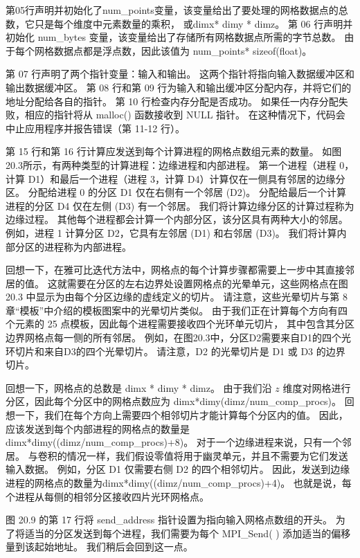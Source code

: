 第05行声明并初始化了num\_points变量，该变量给出了要处理的网格数据点的总数，它只是每个维度中元素数量的乘积，
或dimx* dimy * dimz。 第 06 行声明并初始化 num\_bytes 变量，该变量给出了存储所有网格数据点所需的字节总数。 
由于每个网格数据点都是浮点数，因此该值为 num\_points* sizeof(float)。

第 07 行声明了两个指针变量：输入和输出。 这两个指针将指向输入数据缓冲区和输出数据缓冲区。 
第 08 行和第 09 行为输入和输出缓冲区分配内存，并将它们的地址分配给各自的指针。 第 10 行检查内存分配是否成功。 
如果任一内存分配失败，相应的指针将从 malloc() 函数接收到 NULL 指针。 
在这种情况下，代码会中止应用程序并报告错误（第 11-12 行）。

第 15 行和第 16 行计算应发送到每个计算进程的网格点数组元素的数量。 
如图20.3所示，有两种类型的计算进程：边缘进程和内部进程。 
第一个进程（进程 0，计算 D1）和最后一个进程（进程 3，计算 D4）计算仅在一侧具有邻居的边缘分区。 
分配给进程 0 的分区 D1 仅在右侧有一个邻居 (D2)。 分配给最后一个计算进程的分区 D4 仅在左侧 (D3) 有一个邻居。 
我们将计算边缘分区的计算过程称为边缘过程。 其他每个进程都会计算一个内部分区，该分区具有两种大小的邻居。 
例如，进程 1 计算分区 D2，它具有左邻居 (D1) 和右邻居 (D3)。 我们将计算内部分区的进程称为内部进程。

回想一下，在雅可比迭代方法中，网格点的每个计算步骤都需要上一步中其直接邻居的值。 
这就需要在分区的左右边界处设置网格点的光晕单元，这些网格点在图 20.3 中显示为由每个分区边缘的虚线定义的切片。 
请注意，这些光晕切片与第 8 章“模板”中介绍的模板图案中的光晕切片类似。 
由于我们正在计算每个方向有四个元素的 25 点模板，因此每个进程需要接收四个光环单元切片，
其中包含其分区边界网格点每一侧的所有邻居。 例如，在图20.3中，分区D2需要来自D1的四个光环切片和来自D3的四个光晕切片。 
请注意，D2 的光晕切片是 D1 或 D3 的边界切片。

回想一下，网格点的总数是 dimx * dimy * dimz。 
由于我们沿 $z$ 维度对网格进行分区，因此每个分区中的网格点数应为 dimx*dimy(dimz/num\_comp\_procs)。 
回想一下，我们在每个方向上需要四个相邻切片才能计算每个分区内的值。 
因此，应该发送到每个内部进程的网格点的数量是dimx*dimy((dimz/num\_comp\_procs)+8)。 
对于一个边缘进程来说，只有一个邻居。 与卷积的情况一样，我们假设零值将用于幽灵单元，并且不需要为它们发送输入数据。 
例如，分区 D1 仅需要右侧 D2 的四个相邻切片。 
因此，发送到边缘进程的网格点的数量为dimx*dimy((dimz/num\_comp\_procs)+4)。 
也就是说，每个进程从每侧的相邻分区接收四片光环网格点。

图 20.9 的第 17 行将 send\_address 指针设置为指向输入网格点数组的开头。 
为了将适当的分区发送到每个进程，我们需要为每个 MPI\_Send( ) 添加适当的偏移量到该起始地址。 我们稍后会回到这一点。

